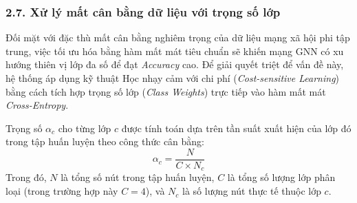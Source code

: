 \subsubsection{2.7. Xử lý mất cân bằng dữ liệu với trọng số lớp}

\indent\indent Đối mặt với đặc thù mất cân bằng nghiêm trọng của dữ liệu mạng xã hội phi tập trung, việc tối ưu hóa bằng hàm mất mát tiêu chuẩn sẽ khiến mạng GNN có xu hướng thiên vị lớp đa số để đạt \textit{Accuracy} cao. Để giải quyết triệt để vấn đề này, hệ thống áp dụng kỹ thuật Học nhạy cảm với chi phí (\textit{Cost-sensitive Learning}) \cite{he2009learning} bằng cách tích hợp trọng số lớp (\textit{Class Weights}) trực tiếp vào hàm mất mát \textit{Cross-Entropy}.\vspace{0.3cm}

Trọng số $\alpha_c$ cho từng lớp $c$ được tính toán dựa trên tần suất xuất hiện của lớp đó trong tập huấn luyện theo công thức cân bằng:
\[
    \alpha_c = \frac{N}{C \times N_c}
\]
Trong đó, $N$ là tổng số nút trong tập huấn luyện, $C$ là tổng số lượng lớp phân loại (trong trường hợp này $C=4$), và $N_c$ là số lượng nút thực tế thuộc lớp $c$.
